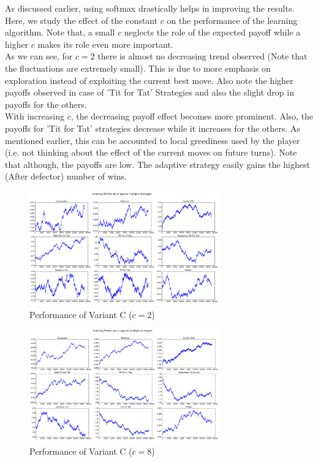 \documentclass[a4paper]{article}
\begin{document}
	As discussed earlier, using softmax drastically helps in improving the results. Here, we study the effect of the constant $c$ on the performance of the learning algorithm. Note that, a small $c$ neglects the role of the expected payoff while a higher $c$ makes its role even more important.\\

	As we can see, for $c=2$ there is almost no decreasing trend observed (Note that the fluctuations are extremely small). This is due to more emphasis on exploration instead of exploiting the current best move. Also note the higher payoffs observed in case of 'Tit for Tat' Strategies and also the slight drop in payoffs for the others.\\
	
	With increasing $c$, the decreasing payoff effect becomes more prominent. Also, the payoffs for 'Tit for Tat' strategies decrease while it increases for the others. As mentioned earlier, this can be accounted to local greediness used by the player (i.e. not thinking about the effect of the current moves on future turns). Note that although, the payoffs are low. The adaptive strategy easily gains the highest (After defector) number of wins.

	\begin{figure}[H]
	\centering
	\includegraphics[width=0.73\textwidth]{learnerInitialC_b2.png}
	\caption*{{Performance of Variant C ($c = 2$)}}
	\end{figure}

	\begin{figure}[H]
	\centering
	\includegraphics[width=0.73\textwidth]{learnerInitialC_b8.png}
	\caption*{{Performance of Variant C ($c = 8$)}}
	\end{figure}
\end{document}
